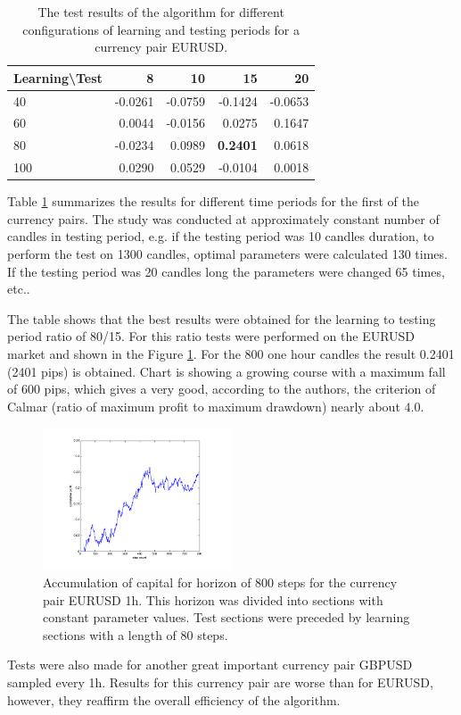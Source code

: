 \documentclass[runningheads,a4paper]{llncs}
\begin{document}
\begin{table}[h!]
\centering
\caption{The test results of the algorithm for different configurations of learning and testing periods for a currency pair EURUSD.}
\label{tab:tab1}
\begin{tabular}{|l|r|r|r|r|} \hline
Learning\textbackslash Test &	8	 &	10 &		15	 &	20 \\ \hline
40 &		-0.0261 &		-0.0759	 &	-0.1424	 &	-0.0653 \\ \hline
60 &		0.0044 &		-0.0156 &		0.0275 &		0.1647 \\ \hline
80 &		-0.0234 &		0.0989 &		\textbf{0.2401} &		0.0618 \\ \hline
100	 &	0.0290 &		0.0529 &		-0.0104	 &	0.0018 \\ \hline
\end{tabular}
\end{table}
\FloatBarrier
Table \ref{tab:tab1} summarizes the results for different time periods for the first of the currency pairs. The study was conducted at approximately constant number of candles in testing period, e.g. if the testing period was 10 candles duration, to perform the test on 1300 candles, optimal parameters were calculated 130 times. If the testing period was 20 candles long the parameters were changed 65 times, etc..

The table shows that the best results were obtained for the learning to testing period ratio of 80/15. For this ratio tests were performed on the EURUSD market and shown in the Figure \ref{fig:fig8}. For the 800 one hour candles the result 0.2401 (2401 pips) is obtained. Chart is showing a growing course with a maximum fall of 600 pips, which gives a very good, according to the authors, the criterion of Calmar (ratio of maximum profit to maximum drawdown) nearly about $4.0$.\\

\begin{figure}[h!]
\centering
\includegraphics[width = 0.5\textwidth]{figures/rys8.png}
\caption{Accumulation of capital for horizon of 800 steps for the currency pair EURUSD 1h. This horizon was divided into sections with constant parameter values. Test sections were preceded by learning sections with a length of 80 steps.}
\label{fig:fig8}
\end{figure}
\FloatBarrier
Tests were also made for another great important currency pair GBPUSD sampled every 1h. Results for this currency pair are worse than for EURUSD, however, they reaffirm the overall efficiency of the algorithm.\\
\end{document}
